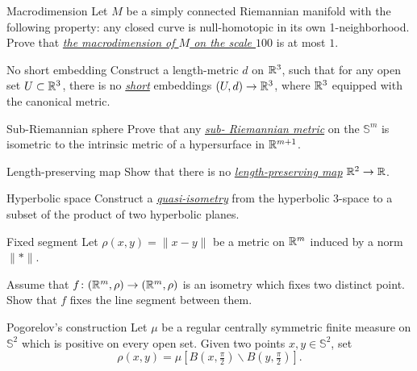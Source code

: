 \documentclass[twoside]{book}
\begin{document}
\begin{pr}{\easy}{Macrodimension}\label{macrodimension} 
Let $M$ be a simply connected Riemannian manifold with the following property: 
any closed curve is null-homotopic 
in its own  1-neighborhood. 
Prove that \hyperref[Macrodimension]{\emph{the macrodimension of $M$ on the scale $100$}} is at most $1$.
\end{pr}


{\begin{pr}{\hard}{No short embedding}\label{weird-metric} 
Construct a length-metric $d$ on $\mathbb{R}^3$,
such that for any open set $U\subset  \mathbb{R}^3$,
there is no \hyperref[Short map]{\emph{short}} embeddings $(U,d)\to \mathbb{R}^3$,
where $\mathbb{R}^3$ equipped with the canonical metric.
\end{pr}

\begin{pr}{\thm}{Sub-Riemannian sphere}\label{sub-Riemannian} 
Prove that any \hyperref[Sub-Riemannian metric]{\emph{sub-\hskip0mm Riemannian metric}} 
on the $\mathbb{S}^m$ is isometric to the intrinsic metric of a hypersurface in $\mathbb{R}^{m+1}$.
\end{pr}

\begin{pr}{\thm}{Length-preserving map}\label{two2one} 
Show that there is no \hyperref[Length-preserving map]{\emph{length-preserving map}} $\mathbb{R}^2\to \mathbb{R}$.
\end{pr}



\begin{pr}{}{Hyperbolic space}\label{Hyperbolic space}
Construct a \hyperref[Quasi-isometry]{\emph{quasi-isometry}}
from the hyperbolic $3$-space 
to a subset 
of the product of two hyperbolic planes.
\end{pr}

\begin{pr}{}{Fixed segment}\label{Fixed segment}
Let $\rho(x,y)=\|x-y\|$ be a metric on $\mathbb{R}^m$ induced by a norm $\|{*}\|$.

Assume that $f\colon(\mathbb{R}^m,\rho)\to(\mathbb{R}^m,\rho)$ is an isometry which fixes two distinct point.
Show that $f$ fixes the line segment between them.
\end{pr}

\begin{pr}{}{Pogorelov's construction}\label{Pogorelov's construction}
Let $\mu$ be a regular centrally symmetric finite measure on $\mathbb{S}^2$ which is positive on every open set.
Given two points $x,y\in \mathbb{S}^2$,
set 
\[\rho(x,y)=\mu[B(x,\tfrac \pi2)\backslash B(y,\tfrac\pi2)].\]


\end{pr}}
\end{document}
